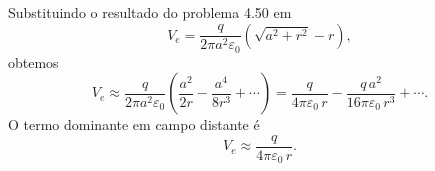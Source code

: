 Substituindo o resultado do problema 4.50 em
\[
V_{e} = \frac{q}{2\pi a^{2} \varepsilon_{0}}\left(\sqrt{a^{2}+r^{2}} - r\right),
\]
obtemos
\[
V_{e} \approx \frac{q}{2\pi a^{2} \varepsilon_{0}}\left(\frac{a^{2}}{2r} - \frac{a^{4}}{8r^{3}} + \cdots\right) = \frac{q}{4\pi\varepsilon_{0}\,r} - \frac{q\,a^{2}}{16\pi\varepsilon_{0}\,r^{3}} + \cdots.
\]
O termo dominante em campo distante é
\[
V_{e} \approx \frac{q}{4\pi\varepsilon_{0}\,r}.
\]